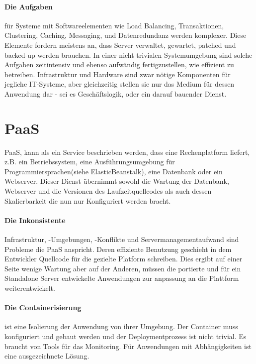 \documentclass[
12pt,
english,
ngerman,
headsepline,
twoside,
openright,
numbers=noenddot,version=first
]{scrreprt}
\begin{document}
\paragraph{Die Aufgaben} für Systeme mit Softwareelementen wie Load Balancing, Transaktionen, Clustering, Caching, Messaging, und Datenredundanz werden komplexer. Diese Elemente fordern meistens an, dass Server verwaltet, gewartet, patched und backed-up werden brauchen. In einer nicht trivialen Systemumgebung sind solche Aufgaben zeitintensiv und ebenso aufwändig fertigzustellen, wie effizient zu betreiben. Infrastruktur und Hardware sind zwar nötige Komponenten für jegliche IT-Systeme, aber gleichzeitig stellen sie nur das Medium für dessen Anwendung dar - sei es Geschäftslogik, oder ein darauf bauender Dienst.

\section{PaaS}
\label{sec:paas}
\acrfull{PaaS}, kann als ein Service beschrieben werden, dass eine Rechenplatform liefert, z.B. ein Betriebssystem, eine Ausführungsumgebung für Programmiersprachen(siehe ElasticBeanstalk), eine Datenbank oder ein Webserver. Dieser Dienst übernimmt sowohl die Wartung der Datenbank, Webserver und die Versionen des Laufzeitquellcodes als auch dessen Skalierbarkeit die nun nur Konfiguriert werden bracht\cite{patternAWS}.

\paragraph{Die Inkonsistente} Infrastruktur, -Umgebungen, -Konflikte und Servermanagementaufwand sind Probleme die \acrshort{PaaS} anspricht. Deren effiziente Benutzung geschieht in dem Entwickler Quellcode für die gezielte Platform schreiben. Dies ergibt auf einer Seite wenige Wartung aber auf der Anderen, müssen die portierte und für ein Standalone Server entwickelte Anwendungen zur anpassung an die Plattform weiterentwickelt.
\paragraph{Die Containerisierung} ist eine Isolierung der Anwendung von ihrer Umgebung. Der Container muss konfiguriert und gebaut werden und der Deploymentprozess ist nicht trivial. Es braucht von Tools für das Monitoring. Für Anwendungen mit Abhängigkeiten ist eine ausgezeichnete Lösung. 
\end{document}
